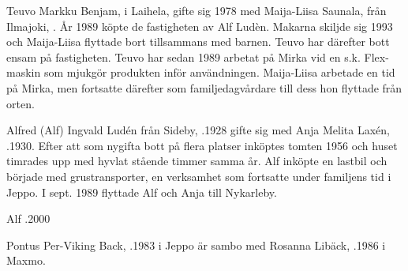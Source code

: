 
Teuvo Markku Benjam,  i Laihela, gifte sig 1978 med Maija-Liisa Saunala, från Ilmajoki, . År 1989 köpte de fastigheten av Alf Ludèn. Makarna skiljde sig 1993 och Maija-Liisa flyttade bort tillsammans med barnen. Teuvo har därefter bott ensam på fastigheten. Teuvo har sedan 1989 arbetat på Mirka vid en s.k. Flex-maskin som mjukgör produkten inför användningen. Maija-Liisa arbetade en tid på Mirka, men fortsatte därefter som familjedagvårdare till dess hon flyttade från orten.
\begin{jhchildren}
  \item {}
  \item {}
  \item {}
  \item {}
\end{jhchildren}


Alfred (Alf) Ingvald Ludén från Sideby, .1928 gifte sig med Anja Melita Laxén, .1930. Efter att som nygifta bott på flera platser inköptes tomten 1956 och huset timrades upp med hyvlat stående timmer samma år. Alf inköpte en lastbil och började med grustransporter, en verksamhet som fortsatte under familjens tid i Jeppo. I sept. 1989 flyttade Alf och Anja till Nykarleby.
\begin{jhchildren}
  \item {}
  \item {}
\end{jhchildren}
Alf .2000







Pontus Per-Viking Back, .1983 i Jeppo är sambo med Rosanna Libäck, .1986 i Maxmo.
\begin{jhchildren}
  \item {}
  \item {}
\end{jhchildren}


